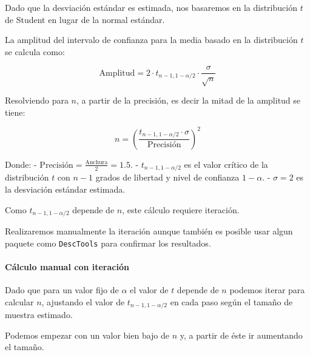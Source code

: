 \documentclass[
]{article}
\begin{document}
Dado que la desviación estándar es estimada, nos basaremos en la distribución \(t\) de Student en lugar de la normal estándar.

La amplitud del intervalo de confianza para la media basado en la distribución \(t\) se calcula como:

\[ \text{Amplitud} = 2 \cdot t_{n-1, 1-\alpha/2} \cdot \frac{\sigma}{\sqrt{n}} \]

Resolviendo para \(n\), a partir de la precisión, es decir la mitad de la amplitud se tiene:

\[ n = \left( \frac{t_{n-1, 1-\alpha/2} \cdot \sigma}{\text{Precisión}} \right)^2 \]

Donde:
- \(\text{Precisión} = \frac{\text{Anchura}}{2} = 1.5\).
- \(t_{n-1, 1-\alpha/2}\) es el valor crítico de la distribución \(t\) con \(n-1\) grados de libertad y nivel de confianza \(1-\alpha\).
- \(\sigma = 2\) es la desviación estándar estimada.

Como \(t_{n-1, 1-\alpha/2}\) depende de \(n\), este cálculo requiere iteración.

Realizaremos manualmente la iteración aunque también es posible usar algun paquete como \texttt{DescTools} para confirmar los resultados.

\paragraph{Cálculo manual con iteración}\label{cuxe1lculo-manual-con-iteraciuxf3n}

Dado que para un valor fijo de \(\alpha\) el valor de \(t\) depende de \(n\) podemos iterar para calcular \(n\), ajustando el valor de \(t_{n-1, 1-\alpha/2}\) en cada paso según el tamaño de muestra estimado.

Podemos empezar con un valor bien bajo de \(n\) y, a partir de éste ir aumentando el tamaño.
\end{document}
